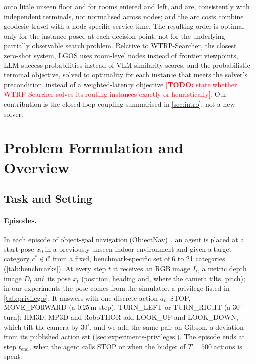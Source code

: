 \documentclass[10pt]{article}
\newcommand{\TODO}[1]{\textcolor{red}{\textbf{[TODO:} #1\textbf{]}}}
\newcommand{\ours}{LGOS\xspace}
\newcommand{\cstar}{c^{*}}
\begin{document}
onto little unseen floor and for rooms entered and left, and are, consistently with independent
terminals, not normalised across nodes; and the arc costs combine geodesic travel with a node-specific
service time. The resulting order is optimal only for the instance posed at each decision point, not for the underlying
partially observable search problem. Relative to WTRP-Searcher, the closest zero-shot system, \ours uses
room-level nodes instead of frontier viewpoints, LLM success probabilities instead of VLM similarity scores,
and the probabilistic-terminal objective, solved to optimality for each instance that meets the solver's
precondition, instead of a weighted-latency objective \TODO{state whether WTRP-Searcher solves its routing
instances exactly or heuristically}. Our contribution is the closed-loop coupling summarised in
\cref{sec:intro}, not a new solver.

\section{Problem Formulation and Overview}
\label{sec:problem}

\subsection{Task and Setting}
\label{sec:problem-task}

\paragraph{Episodes.}
In each episode of object-goal navigation (ObjectNav)~\citep{batra2020objectnav}, an agent is placed at a start pose
$x_0$ in a previously unseen indoor environment and given a target category $\cstar \in \mathcal{C}$ from a fixed,
benchmark-specific set of 6 to 21 categories (\cref{tab:benchmarks}). At every step $t$ it receives an RGB image $I_t$,
a metric depth image $D_t$ and its pose $x_t$ (position, heading and, where the camera tilts, pitch); in our experiments
the pose comes from the simulator, a privilege listed in \cref{tab:privileges}. It answers with one discrete action
$a_t$: STOP, MOVE\_FORWARD (a $0.25$\,m step), TURN\_LEFT or TURN\_RIGHT (a $30^\circ$ turn); HM3D, MP3D and
RoboTHOR add LOOK\_UP and LOOK\_DOWN, which tilt the camera by $30^\circ$, and we add the same pair on Gibson, a
deviation from its published action set (\cref{sec:experiments-privileges}). The episode ends at step
$t_{\mathrm{end}}$, when the agent calls STOP or when the budget of
$T = 500$ actions is spent.
\end{document}
